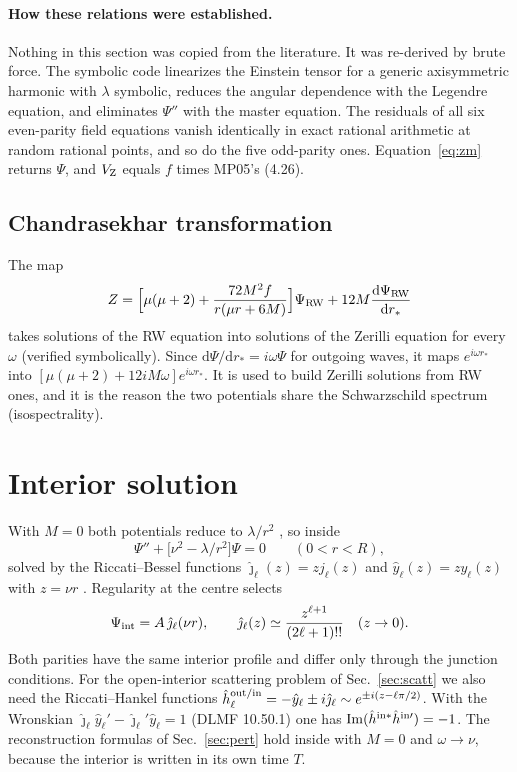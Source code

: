\documentclass[11pt,a4paper]{article}
\numberwithin{equation}{section}
\newcommand{\dd}{\mathrm{d}}
\newcommand{\jh}{\hat\jmath_\ell}
\newcommand{\yh}{\hat y_\ell}
\begin{document}
\paragraph{How these relations were established.} Nothing in this section was copied from the literature. It was
re-derived by brute force. The symbolic code linearizes the Einstein tensor for a generic axisymmetric harmonic with
$\lambda$ symbolic, reduces the angular dependence with the Legendre equation, and eliminates $\Psi''$ with the master
equation. The residuals of all six even-parity field equations vanish identically in exact rational arithmetic at
random rational points, and so do the five odd-parity ones. Equation~\eqref{eq:zm} returns $\Psi$, and $V_{\rm Z}$
equals $f$ times MP05's (4.26).

\subsection{Chandrasekhar transformation}
The map \cite{Chandrasekhar83,Pani09}
\begin{equation}
Z=\Big[\mu(\mu+2)+\frac{72M^2f}{r(\mu r+6M)}\Big]\Psi_{\rm RW}+12M\frac{\dd\Psi_{\rm RW}}{\dd r_*}
\label{eq:chandra}
\end{equation}
takes solutions of the RW equation into solutions of the Zerilli equation for every $\omega$ (verified symbolically).
Since $\dd\Psi/\dd r_*=i\omega\Psi$ for outgoing waves, it maps $e^{i\omega r_*}$ into
$[\mu(\mu+2)+12iM\omega]e^{i\omega r_*}$. It is used to build Zerilli solutions from RW ones, and it is the reason
the two potentials share the Schwarzschild spectrum (isospectrality).

\section{Interior solution}\label{sec:interior}
With $M=0$ both potentials reduce to $\lambda/r^2$ \cite{ondas}, so inside
\begin{equation}
\Psi''+\big[\nu^2-\lambda/r^2\big]\Psi=0\qquad(0<r<R),
\end{equation}
solved by the Riccati--Bessel functions $\jh(z)=zj_\ell(z)$ and $\yh(z)=zy_\ell(z)$ with $z=\nu r$
\cite{AS72,DLMF,ondas}. Regularity at the centre selects
\begin{equation}
\Psi_{\rm int}=A\,\jh(\nu r),\qquad \jh(z)\simeq\frac{z^{\ell+1}}{(2\ell+1)!!}\quad(z\to0).
\label{eq:intsol}
\end{equation}
Both parities have the same interior profile and differ only through the junction conditions. For the open-interior
scattering problem of Sec.~\ref{sec:scatt} we also need the Riccati--Hankel functions
$\hat h^{\rm out/in}_\ell=-\yh\pm i\jh\sim e^{\pm i(z-\ell\pi/2)}$. With the Wronskian $\jh\yh'-\jh'\yh=1$ (DLMF
10.50.1) one has ${\rm Im}(\hat h^{\rm in*}\hat h^{\rm in\prime})=-1$. The reconstruction formulas of
Sec.~\ref{sec:pert} hold inside with $M=0$ and $\omega\to\nu$, because the interior is written in its own time $T$.
\end{document}

